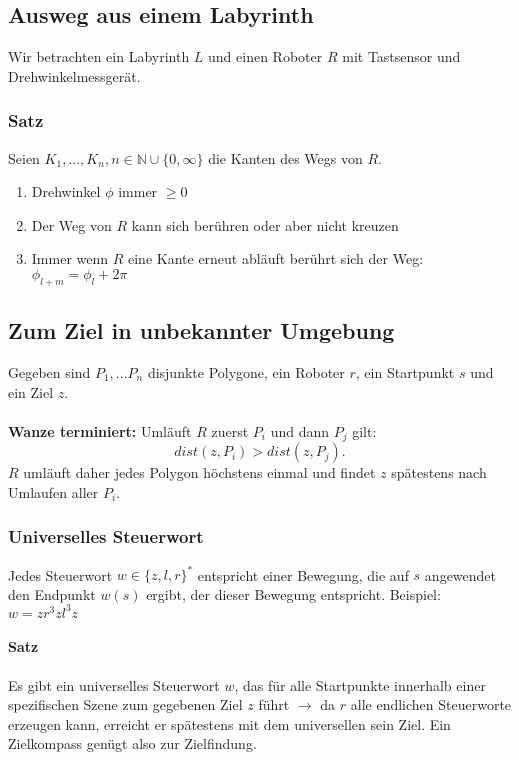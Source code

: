 \subsection{Ausweg aus einem Labyrinth}
Wir betrachten ein Labyrinth \(L\) und einen Roboter \(R\) mit Tastsensor und Drehwinkelmessgerät.
\text{}\\


\subsubsection{Satz}
Seien \(K_1,...,K_n, n \in \mathbb{N} \cup \{0,\infty\}\) die Kanten des Wegs von \(R\).
\begin{enumerate}
	\item Drehwinkel \(\phi\) immer \(\geq 0\)
	\item Der Weg von \(R\) kann sich berühren oder aber nicht kreuzen
	\item Immer wenn \(R\) eine Kante erneut abläuft berührt sich der Weg: \(\phi_{l+m}=\phi_l+2\pi\)
\end{enumerate}


\subsection{Zum Ziel in unbekannter Umgebung}
Gegeben sind \(P_1,...P_n\) disjunkte Polygone, ein Roboter \(r\), ein Startpunkt \(s\) und ein Ziel \(z\).
\text{}\\

\text{}\\
\textbf{Wanze terminiert:} Umläuft \(R\) zuerst \(P_i\) und dann \(P_j\) gilt:
\[dist(z,P_i) > dist(z,P_j).\]
\(R\) umläuft daher jedes Polygon höchstens einmal und findet \(z\) spätestens nach Umlaufen aller \(P_i\).

\subsubsection{Universelles Steuerwort}
Jedes Steuerwort \(w \in \{z,l,r\}^*\) entspricht einer Bewegung, die auf \(s\) angewendet den Endpunkt \(w(s)\) ergibt, der dieser Bewegung entspricht. Beispiel: \(w = zr^3zl^3z\)

\paragraph{Satz}
Es gibt ein universelles Steuerwort \(w\), das für alle Startpunkte innerhalb einer spezifischen Szene zum gegebenen Ziel \(z\) führt \(\rightarrow \) da \(r\) alle endlichen Steuerworte erzeugen kann, erreicht er spätestens mit dem universellen sein Ziel. Ein Zielkompass genügt also zur Zielfindung.

